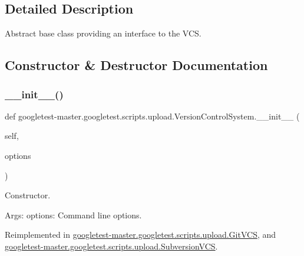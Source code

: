 \subsection{Detailed Description}
\begin{DoxyVerb}Abstract base class providing an interface to the VCS.\end{DoxyVerb}
 

\subsection{Constructor \& Destructor Documentation}
\mbox{\label{classgoogletest-master_1_1googletest_1_1scripts_1_1upload_1_1_version_control_system_a28c02d45c4bd32f9750090e1eda733a3}} 
\subsubsection{\texorpdfstring{\_\_init\_\_()}{\_\_init\_\_()}}
{\footnotesize\ttfamily def googletest-\/master.\+googletest.\+scripts.\+upload.\+Version\+Control\+System.\+\_\+\+\_\+init\+\_\+\+\_\+ (\begin{DoxyParamCaption}\item[{}]{self,  }\item[{}]{options }\end{DoxyParamCaption})}

\begin{DoxyVerb}Constructor.

Args:
  options: Command line options.
\end{DoxyVerb}
 

Reimplemented in \mbox{\hyperlink{classgoogletest-master_1_1googletest_1_1scripts_1_1upload_1_1_git_v_c_s_a3ccc3d3f7f2cbbbfd6b67243bfa71d74}{googletest-\/master.\+googletest.\+scripts.\+upload.\+Git\+V\+CS}}, and \mbox{\hyperlink{classgoogletest-master_1_1googletest_1_1scripts_1_1upload_1_1_subversion_v_c_s_af7b67fa318df02166babb35cc4d71605}{googletest-\/master.\+googletest.\+scripts.\+upload.\+Subversion\+V\+CS}}.



